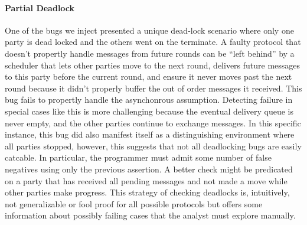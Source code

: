 \paragraph{Partial Deadlock} 
One of the bugs we inject presented a unique dead-lock scenario where only one
party is dead locked and the others went on the terminate.  A faulty protocol
that doesn't propertly handle messages from future rounds can be ``left
behind'' by a scheduler that lets other parties move to the next round,
delivers future messages to this party before the current round, and ensure it
never moves past the next round because it didn't properly buffer the out of
order messages it received.  This bug fails to propertly handle the
asynchonrous assumption.  Detecting failure in special cases like this is more
challenging because the eventual delivery queue is never empty, and the other
parties continue to exchange messages.  In this specific instance, this bug did
also manifest itself as a distinguishing environment where all parties stopped,
however, this suggests that not all deadlocking bugs are easily catcable.  In
particular, the programmer must admit some number of false negatives using only
the previous assertion.  A better check might be predicated on a party that has
received all pending messages and not made a move while other parties make
progress.  This strategy of checking deadlocks is, intuitively, not
generalizable or fool proof for all possible protocols but offers some
information about possibly failing cases that the analyst must explore
manually.

